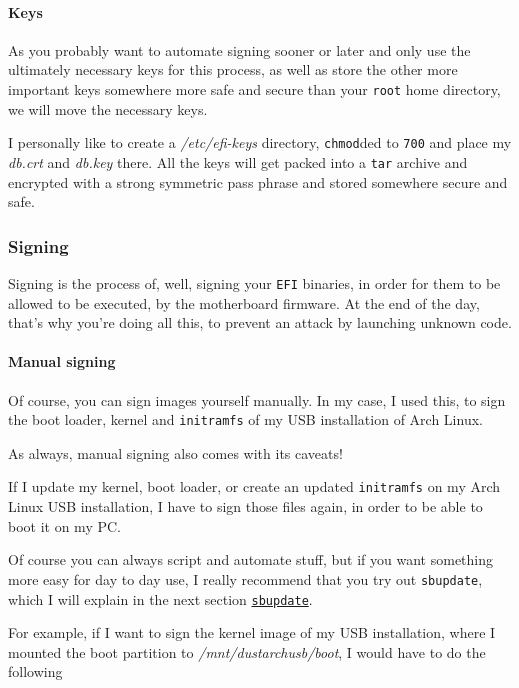 \documentclass[9pt]{report}
\newenvironment{NOTE}
{\begin{tcolorbox}[colback=admonitionBG,coltitle=draculaFG,colframe=draculaBlue,colbacktitle=draculaBlue,title=NOTE]}
{\end{tcolorbox}}
\begin{document}
\newpage

\hypertarget{x-keys}{\paragraph{Keys}}
As you probably want to automate signing sooner or later and only use the ultimately necessary keys for this process, as well as store the other more important keys somewhere more safe and secure than your \texttt{root} home directory, we will move the necessary keys.


I personally like to create a \textit{/etc/efi-keys} directory, \texttt{chmod}ded to \texttt{700} and place my \textit{db.crt} and \textit{db.key} there.
All the keys will get packed into a \texttt{tar} archive and encrypted with a strong symmetric pass phrase and stored somewhere secure and safe.



\newpage

\hypertarget{x-signing}{\subsubsection{Signing}}
Signing is the process of, well, signing your \texttt{EFI} binaries, in order for them to be allowed to be executed, by the motherboard firmware.
At the end of the day, that’s why you’re doing all this, to prevent an attack by launching unknown code.



\newpage

\hypertarget{x-manual-signing}{\paragraph{Manual signing}}
Of course, you can sign images yourself manually.
In my case, I used this, to sign the boot loader, kernel and \texttt{initramfs} of my USB installation of Arch Linux.


\begin{NOTE}
    As always, manual signing also comes with its caveats!


    If I update my kernel, boot loader, or create an updated \texttt{initramfs} on my Arch Linux USB installation, I have to sign those files again, in order to be able to boot it on my PC.


    Of course you can always script and automate stuff, but if you want something more easy for day to day use, I really recommend that you try out \texttt{sbupdate},  which I will explain in the next section \hyperlink{x-sbupdate}{\texttt{sbupdate}}.

\end{NOTE}
For example, if I want to sign the kernel image of my USB installation, where I mounted the boot partition to \textit{/mnt/dustarchusb/boot}, I would have to do the following
\end{document}
